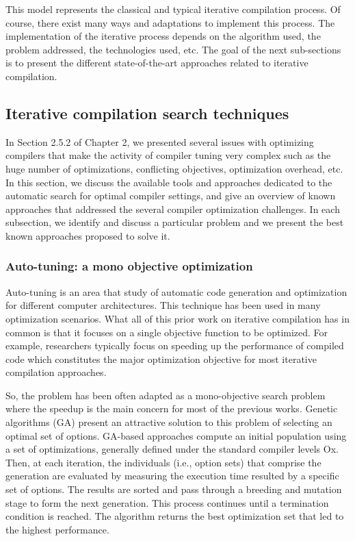 This model represents the classical and typical iterative compilation process. Of course, there exist many ways and adaptations to implement this process. The implementation of the iterative process depends on the algorithm used, the problem addressed, the technologies used, etc. The goal of the next sub-sections is to present the different state-of-the-art approaches related to iterative compilation.

\subsection{Iterative compilation search techniques}
In Section 2.5.2 of Chapter 2, we presented several issues with optimizing compilers that make the activity of compiler tuning very complex such as the huge number of optimizations, conflicting objectives, optimization overhead, etc.
In this section, we discuss the available tools and approaches dedicated to the automatic search for optimal compiler settings, and give an overview of known approaches that addressed the several compiler optimization challenges. In each subsection, we identify and discuss a particular problem and we present the best known approaches proposed to solve it.

\subsubsection{Auto-tuning: a mono objective optimization}
Auto-tuning is an area that study of automatic code generation and optimization for different computer architectures.
This technique has been used in many optimization scenarios.
What all of this prior work on iterative compilation has in common is that it focuses on a single objective function to be optimized. For example, researchers typically focus on speeding up the performance of compiled code which constitutes the major optimization objective for most iterative compilation approaches\cite{pan2006fast,haneda2005automatic}. 

So, the problem has been often adapted as a mono-objective search problem where the speedup is the main concern for most of the previous works. 
Genetic algorithms (GA)\cite{stephenson2003genetic,bashkansky2007black} present an attractive solution to this problem of selecting an optimal set of options. 
GA-based approaches compute an initial population using a set of optimizations, generally defined under the standard compiler levels Ox. Then, at each iteration, the individuals (i.e., option sets) that comprise the generation are evaluated by measuring the execution time resulted by a specific set of options. The results are sorted and pass through a breeding and mutation stage to form the next generation. This
process continues until a termination condition is reached. The algorithm returns the best optimization set that led to the highest performance.

